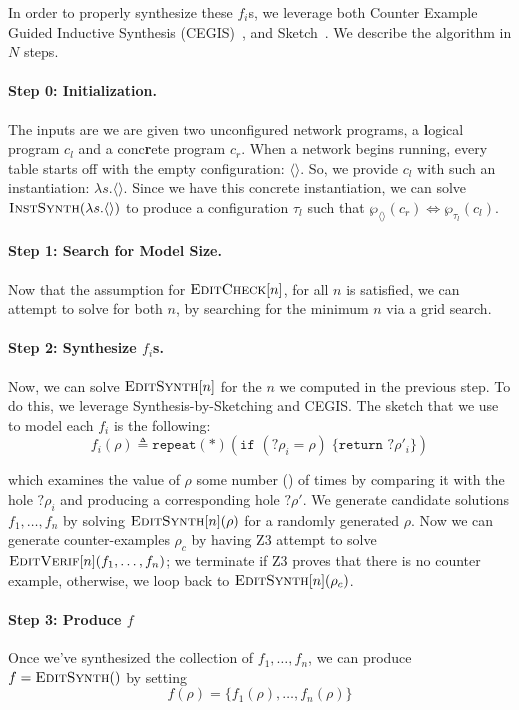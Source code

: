 In order to properly synthesize these $f_i$s, we leverage both Counter Example
Guided Inductive Synthesis (CEGIS)~\cite{CEGIS}, and Sketch~\cite{Sketch}. We
describe the algorithm in $N$ steps.

\paragraph{Step 0: Initialization.} The inputs are we are given two unconfigured
network programs, a \textbf{l}ogical program $c_l$ and a conc\textbf{r}ete
program $c_r$. When a network begins running, every table starts off with the
empty configuration: $\langle\rangle$. So, we provide $c_l$ with such an
instantiation: $\lambda s. \langle \rangle$. Since we have this concrete
instantiation, we can solve $\textsc{InstSynth}(\lambda s. \langle\rangle)$ to
produce a configuration $\tau_l$ such that
$\wp_{\langle\rangle}(c_r) \Leftrightarrow \wp_{\tau_l}(c_l)$.

\paragraph{Step 1: Search for Model Size.} Now that the assumption for
$\textsc{EditCheck}[n]$, for all $n$ is satisfied, we can attempt to solve for
both $n$, by searching for the minimum $n$ via a grid search.

\paragraph{Step 2: Synthesize $f_i$s.} Now, we can solve $\textsc{EditSynth}[n]$
for the $n$ we computed in the previous step. To do this, we leverage
Synthesis-by-Sketching and CEGIS. The sketch that we use to model each $f_i$ is
the following:
\[f_i(\rho) \triangleq \texttt{repeat}(*)\left(\texttt{if }(?\rho_i = \rho)\;\{\texttt{return }?\rho'_i\}\right)\]

which examines the value of $\rho$ some number () of times by comparing it with
the hole $?\rho_i$ and producing a corresponding hole $?\rho'$. We generate
candidate solutions $f_1,\ldots, f_n$ by solving $\textsc{EditSynth}[n](\rho)$
for a randomly generated $\rho$. Now we can generate counter-examples $\rho_c$
by having Z3 attempt to solve $\textsc{EditVerif}[n](f_1,\ldots,f_n)$; we
terminate if Z3 proves that there is no counter example, otherwise, we loop back
to $\textsc{EditSynth}[n](\rho_c)$. 

\paragraph{Step 3: Produce $f$} Once we've synthesized the collection of
$f_1, \ldots, f_n$, we can produce $f = \textsc{EditSynth}()$ by setting
\[f(\rho) = \{f_1(\rho), \ldots, f_n(\rho)\}\]


